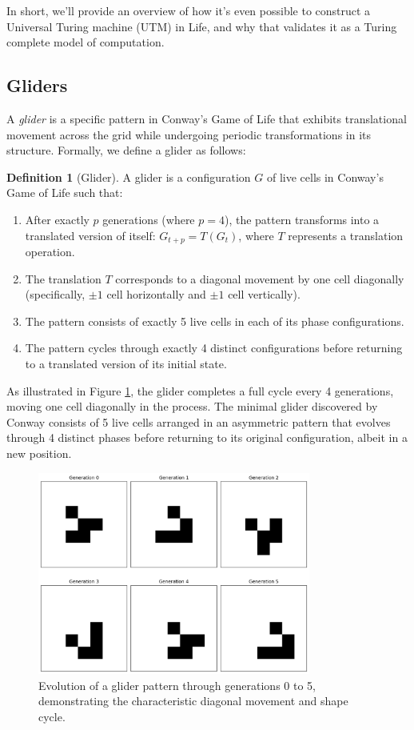 \documentclass{article}
\theoremstyle{definition}
\newtheorem{definition}{Definition}[section]
\theoremstyle{plain}
\theoremstyle{plain}
\begin{document}
In short, we'll provide an overview of how it's even possible to construct a Universal Turing machine (UTM) in Life, and why that validates it as a Turing complete model of computation.

\subsection{Gliders}

A \textit{glider} is a specific pattern in Conway's Game of Life that exhibits translational movement across the grid while undergoing periodic transformations in its structure. Formally, we define a glider as follows:

\begin{definition}[Glider]
A glider is a configuration $G$ of live cells in Conway's Game of Life such that:
\begin{enumerate}
    \item After exactly $p$ generations (where $p = 4$), the pattern transforms into a translated version of itself: $G_{t+p} = T(G_t)$, where $T$ represents a translation operation.
    \item The translation $T$ corresponds to a diagonal movement by one cell diagonally (specifically, $\pm 1$ cell horizontally and $\pm 1$ cell vertically).
    \item The pattern consists of exactly 5 live cells in each of its phase configurations.
    \item The pattern cycles through exactly 4 distinct configurations before returning to a translated version of its initial state.
\end{enumerate}
\end{definition}

As illustrated in Figure \ref{fig:glider-generations}, the glider completes a full cycle every 4 generations, moving one cell diagonally in the process. The minimal glider discovered by Conway consists of 5 live cells arranged in an asymmetric pattern that evolves through 4 distinct phases before returning to its original configuration, albeit in a new position.

\begin{figure}[H]
  \centering
  \includegraphics[width=0.8\textwidth]{figures/glider_generations_0_to_5.png}
  \caption{Evolution of a glider pattern through generations 0 to 5, demonstrating the characteristic diagonal movement and shape cycle.}
  \label{fig:glider-generations}
\end{figure}
\end{document}
